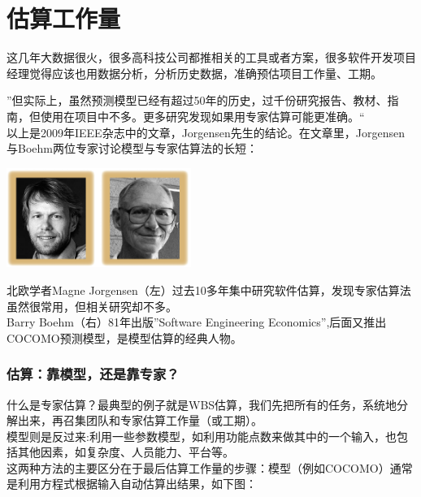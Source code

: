 \chapter{估算工作量} %


这几年大数据很火，很多高科技公司都推相关的工具或者方案，很多软件开发项目经理觉得应该也用数据分析，分析历史数据，准确预估项目工作量、工期。

''但实际上，虽然预测模型已经有超过50年的历史，过千份研究报告、教材、指南，但使用在项目中不多。更多研究发现如果用专家估算可能更准确。``\\
以上是2009年IEEE杂志中的文章，Jorgensen先生的结论。在文章里，Jorgensen与Boehm两位专家讨论模型与专家估算法的长短：


\includegraphics[width=6cm]{估算专家.png}

北欧学者Magne Jorgensen（左）过去10多年集中研究软件估算，发现专家估算法虽然很常用，但相关研究却不多。\\
Barry Boehm（右）81年出版''Software Engineering Economics'',后面又推出COCOMO预测模型，是模型估算的经典人物。\\

\hypertarget{ux4f30ux7b97ux9760ux6a21ux578bux8fd8ux662fux9760ux4e13ux5bb6model-based-vs-expert-based-estimation}{%
\subsection{估算：靠模型，还是靠专家？}\label{ux4f30ux7b97ux9760ux6a21ux578bux8fd8ux662fux9760ux4e13ux5bb6model-based-vs-expert-based-estimation}}

什么是专家估算？最典型的例子就是WBS估算，我们先把所有的任务，系统地分解出来，再召集团队和专家估算工作量（或工期）。\\
模型则是反过来:利用一些参数模型，如利用功能点数来做其中的一个输入，也包括其他因素，如复杂度、人员能力、平台等。\\
这两种方法的主要区分在于最后估算工作量的步骤：模型（例如COCOMO）通常是利用方程式根据输入自动估算出结果，如下图：\\

